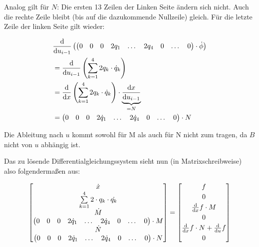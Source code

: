 \documentclass[12pt, a4paper]{scrartcl}
\begin{document}
Analog gilt für \(N\): Die ersten 13 Zeilen der Linken Seite ändern sich nicht. Auch die rechte Zeile bleibt (bis auf die dazukommende Nullzeile) gleich. Für die letzte Zeile der linken Seite gilt wieder:

\begin{align*}
	& \frac{\textup{d}}{\textup{d}u_{i-1}} \left( \begin{pmatrix} 0 & 0 & 0 & 2q_1 & \dots & 2q_4 & 0 & \dots & 0 \end{pmatrix} \cdot \dot{\phi}\right)  \\
	& = \frac{\textup{d}}{\textup{d}u_{i-1}} \left( \sum_{k=1}^4{2q_k \cdot \dot{q}_k}\right) \\
	& = \frac{\textup{d}}{\textup{d}x} \left( \sum_{k=1}^4{2q_k \cdot \dot{q}_k}\right) \cdot \underbrace{\frac{\textup{d}x}{\textup{d}u_{i-1}}}_{=N} \\
	& = \begin{pmatrix} 0 & 0 & 0 & 2\dot{q}_1 & \dots & 2\dot{q}_4 & 0 & \dots & 0 \end{pmatrix} \cdot N
\end{align*}

Die Ableitung nach \(u\) kommt sowohl für M als auch für N nicht zum tragen, da \(B\) nicht von \(u\) abhängig ist.

Das zu lösende Differentialgleichungssystem sieht nun (in Matrixschreibweise) also folgendermaßen aus:

\[
	 \begin{bmatrix} \dot{x} \\
									 \sum\limits_{k=1}^4{2\cdot q_k \cdot \dot{q_k}} \\
									 \dot{M} \\
									 \begin{pmatrix} 0 & 0 & 0 & 2\dot{q}_1 & \dots & 2\dot{q}_4 & 0 & \dots & 0 \end{pmatrix} \cdot M \\
									 \dot{N} \\
									 \begin{pmatrix} 0 & 0 & 0 & 2\dot{q}_1 & \dots & 2\dot{q}_4 & 0 & \dots & 0 \end{pmatrix} \cdot N
		\end{bmatrix}	
 = \begin{bmatrix} f \vspace{0.6ex} \\
									 0 \vspace{0.6ex} \\
									 \frac{\textup{d}}{\textup{d}x} f \cdot M \vspace{0.6ex} \\
									 0 \vspace{0.6ex} \\
									 \frac{\textup{d}}{\textup{d}x} f \cdot N + \frac{\textup{d}}{\textup{d}u} f \vspace{0.6ex} \\
									 0
	 \end{bmatrix}
\]
\end{document}
